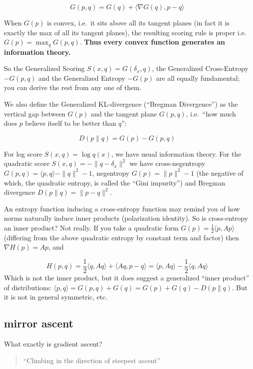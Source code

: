 \[G(p,q)=G(q)+\langle\nabla G(q), p-q\rangle\]

When \(G(p)\) is convex, i.e.~it sits above all its tangent planes (in fact it is exactly the max of all its tangent planes), the resulting scoring rule is proper i.e.~\(G(p)=\max_q G(p,q)\). \textbf{Thus every convex function generates an information theory.}

So the Generalized Scoring \(S(x,q)=G(\delta_x, q)\), the Generalized Cross-Entropy \(-G(p,q)\) and the Generalized Entropy \(-G(p)\) are all equally fundamental; you can derive the rest from any one of them.

We also define the Generalized KL-divergence (``Bregman Divergence'') as the vertical gap between \(G(p)\) and the tangent plane \(G(p,q)\), i.e.~``how much does \(p\) believe itself to be better than \(q\)'':

\[D(p\parallel q)=G(p)-G(p,q)\]

For log score \(S(x, q)=\log q(x)\), we have usual information theory. For the quadratic score \(S(x,q)=-\|q-\delta_x\|^2\) we have cross-negentropy \(G(p,q)=\langle p, q\rangle-\|q\|^2-1\), negentropy \(G(p)=\|p\|^2-1\) (the negative of which, the quadratic entropy, is called the ``Gini impurity'') and Bregman divergence \(D(p\parallel q)=\|p-q\|^2\).

An entropy function inducing a cross-entropy function may remind you of how norms naturally induce inner products (polarization identity). So is cross-entropy an inner product? Not really. If you take a quadratic form \(G(p)=\frac12 \langle p, A p\rangle\) (differing from the above quadratic entropy by constant term and factor) then \(\nabla H(p)=Ap\), and

\[H(p,q)= \frac12 \langle q, A q\rangle+\langle Aq, p-q\rangle=\langle p,Aq\rangle-\frac12 \langle q,Aq\rangle\] Which is not the inner product, but it does suggest a generalized ``inner product'' of distributions: \(\langle p, q\rangle =G(p,q)+G(q)=G(p)+G(q)-D(p\parallel q)\). But it is not in general symmetric, etc.

\hypertarget{mirror-ascent}{%
\subsection{mirror ascent}\label{mirror-ascent}}

What exactly is gradient ascent?

\begin{quote}
``Climbing in the direction of steepest ascent''
\end{quote}

